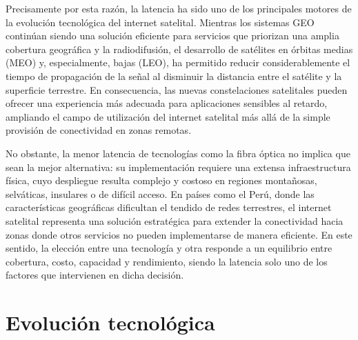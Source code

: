 Precisamente por esta razón, la latencia ha sido uno de los principales motores de la evolución tecnológica del internet satelital. Mientras los sistemas GEO continúan siendo una solución eficiente para servicios que priorizan una amplia cobertura geográfica y la radiodifusión, el desarrollo de satélites en órbitas medias (MEO) y, especialmente, bajas (LEO), ha permitido reducir considerablemente el tiempo de propagación de la señal al disminuir la distancia entre el satélite y la superficie terrestre. En consecuencia, las nuevas constelaciones satelitales pueden ofrecer una experiencia más adecuada para aplicaciones sensibles al retardo, ampliando el campo de utilización del internet satelital más allá de la simple provisión de conectividad en zonas remotas.

No obstante, la menor latencia de tecnologías como la fibra óptica no implica que sean la mejor alternativa: su implementación requiere una extensa infraestructura física, cuyo despliegue resulta complejo y costoso en regiones montañosas, selváticas, insulares o de difícil acceso. En países como el Perú, donde las características geográficas dificultan el tendido de redes terrestres, el internet satelital representa una solución estratégica para extender la conectividad hacia zonas donde otros servicios no pueden implementarse de manera eficiente. En este sentido, la elección entre una tecnología y otra responde a un equilibrio entre cobertura, costo, capacidad y rendimiento, siendo la latencia solo uno de los factores que intervienen en dicha decisión.

\section{Evolución tecnológica}

